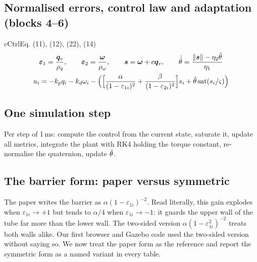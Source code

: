 
\subsection{Normalised errors, control law and adaptation (blocks 4--6)}

\begin{eqbox}{cCtrl}{Eq. (11), (12), (22), (14)}
\begin{gather*}
\bm{\varepsilon}_1=\frac{\bm{q}_v}{\rho_q},\qquad \bm{\varepsilon}_2=\frac{\bm{\omega}}{\rho_\omega},\qquad \bm{s}=\bm{\omega}+c\bm{q}_v,\qquad
\dot{\hat{\theta}}=\frac{\|\bm{s}\|-\eta_2\hat{\theta}}{\eta_1}\\
u_i=-k_pq_i-k_d\omega_i-\Big(\Big[\frac{\alpha}{(1-\varepsilon_{1i})^2}+\frac{\beta}{(1-\varepsilon_{2i})^2}\Big]s_i+\hat{\theta}\operatorname{sat}(s_i/\varsigma)\Big)
\end{gather*}
\end{eqbox}

\subsection{One simulation step}

Per step of 1\,ms: compute the control from the current state, saturate it, update all metrics, integrate the plant
with RK4 holding the torque constant, re-normalise the quaternion, update $\hat{\theta}$.

\subsection{The barrier form: paper versus symmetric}
\label{sec:barrierform}

\begin{idea}
The paper writes the barrier as $\alpha(1-\varepsilon_{1i})^{-2}$. Read literally, this gain explodes when
$\varepsilon_{1i}\to+1$ but tends to $\alpha/4$ when $\varepsilon_{1i}\to-1$: it guards the upper wall of the tube far more
than the lower wall. The two-sided version $\alpha(1-\varepsilon_{1i}^2)^{-2}$ treats both walls alike. Our first browser
and Gazebo code used the two-sided version without saying so. We now treat the paper form as the reference and report
the symmetric form as a named variant in every table.
\end{idea}

